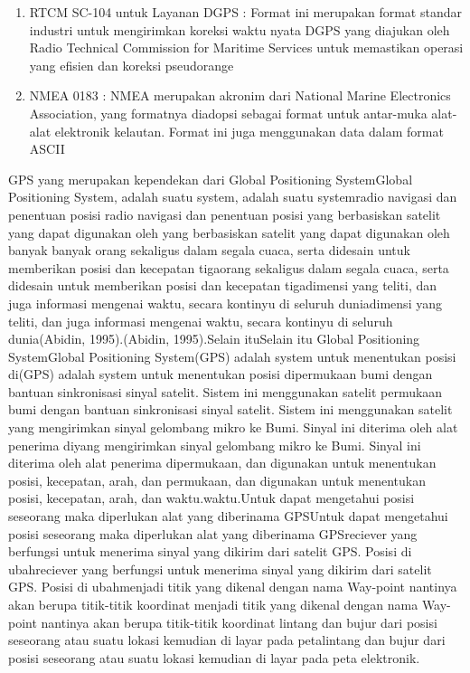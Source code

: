 \begin{enumerate}
\begin{enumerate}
		\item RTCM SC-104 untuk Layanan DGPS : Format ini merupakan format standar industri untuk mengirimkan koreksi waktu nyata DGPS yang diajukan oleh Radio Technical Commission for Maritime Services untuk memastikan operasi yang efisien dan koreksi pseudorange
		\item NMEA 0183 : NMEA merupakan akronim dari National Marine Electronics Association, yang formatnya diadopsi sebagai format untuk antar-muka alat-alat elektronik kelautan. Format ini juga menggunakan data dalam format ASCII
	\end{enumerate}
GPS yang merupakan kependekan dari Global Positioning SystemGlobal Positioning System, adalah suatu system, adalah suatu systemradio navigasi dan penentuan posisi radio navigasi dan penentuan posisi yang berbasiskan satelit yang dapat digunakan oleh yang berbasiskan satelit yang dapat digunakan oleh banyak banyak orang sekaligus dalam segala cuaca, serta didesain untuk memberikan posisi dan kecepatan tigaorang sekaligus dalam segala cuaca, serta didesain untuk memberikan posisi dan kecepatan tigadimensi yang teliti, dan juga informasi mengenai waktu, secara kontinyu di seluruh duniadimensi yang teliti, dan juga informasi mengenai waktu, secara kontinyu di seluruh dunia(Abidin, 1995).(Abidin, 1995).Selain ituSelain itu Global Positioning SystemGlobal Positioning System(GPS) adalah system untuk menentukan posisi di(GPS) adalah system untuk menentukan posisi dipermukaan bumi dengan bantuan sinkronisasi sinyal satelit. Sistem ini menggunakan satelit permukaan bumi dengan bantuan sinkronisasi sinyal satelit. Sistem ini menggunakan satelit yang mengirimkan sinyal gelombang mikro ke Bumi. Sinyal ini diterima oleh alat penerima diyang mengirimkan sinyal gelombang mikro ke Bumi. Sinyal ini diterima oleh alat penerima dipermukaan, dan digunakan untuk menentukan posisi, kecepatan, arah, dan permukaan, dan digunakan untuk menentukan posisi, kecepatan, arah, dan waktu.waktu.Untuk dapat mengetahui posisi seseorang maka diperlukan alat yang diberinama GPSUntuk dapat mengetahui posisi seseorang maka diperlukan alat yang diberinama GPSreciever yang berfungsi untuk menerima sinyal yang dikirim dari satelit GPS. Posisi di ubahreciever yang berfungsi untuk menerima sinyal yang dikirim dari satelit GPS. Posisi di ubahmenjadi titik yang dikenal dengan nama Way-point nantinya akan berupa titik-titik koordinat menjadi titik yang dikenal dengan nama Way-point nantinya akan berupa titik-titik koordinat lintang dan bujur dari posisi seseorang atau suatu lokasi kemudian di layar pada petalintang dan bujur dari posisi seseorang atau suatu lokasi kemudian di layar pada peta elektronik.
\end{enumerate}

